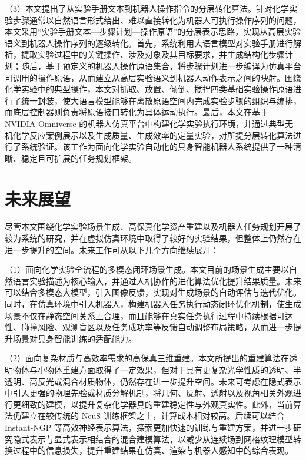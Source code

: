 （3）本文提出了从实验手册文本到机器人操作指令的分层转化算法。针对化学实验步骤通常以自然语言形式给出、难以直接转化为机器人可执行操作序列的问题，本文采用“实验手册文本—步骤计划—操作原语”的分层表示思路，实现从高层实验语义到机器人操作序列的逐级转化。首先，系统利用大语言模型对实验手册进行解析，提取实验过程中的关键操作、涉及对象及其目标要求，并生成结构化步骤计划；随后，基于预定义的机器人操作原语集合，将步骤计划进一步编译为仿真平台可调用的操作原语，从而建立从高层实验语义到机器人动作表示之间的映射。围绕化学实验中的典型操作，本文对抓取、放置、倾倒、搅拌四类基础实验操作原语进行了统一封装，使大语言模型能够在离散原语空间内完成实验步骤的组织与编排，而底层控制器则负责将原语接口转化为具体运动执行。最后，本文在基于 NVIDIA Omniverse 的机器人仿真平台中构建化学实验执行环境，并通过典型无机化学反应案例展示以及生成质量、生成效率的定量实验，对所提分层转化算法进行了系统验证。该工作为面向化学实验自动化的具身智能机器人系统提供了一种清晰、稳定且可扩展的任务规划框架。

\section{未来展望}

尽管本文围绕化学实验场景生成、高保真化学资产重建以及机器人任务规划开展了较为系统的研究，并在虚拟仿真环境中取得了较好的实验结果，但整体上仍然存在进一步提升的空间。未来工作可从以下几个方向继续展开：

（1）面向化学实验全流程的多模态闭环场景生成。本文目前的场景生成主要以自然语言实验描述为核心输入，并通过人机协作的进化算法优化提升结果质量。未来可以结合多模态大模型，引入图像反馈，实现对生成场景的自动评估与迭代优化。同时，在仿真环境中引入机器人，构建机器人任务执行动态闭环优化机制，使生成场景不仅在静态空间关系上合理，而且能够在真实任务执行过程中持续根据可达性、碰撞风险、观测盲区以及任务成功率等反馈自动调整布局策略，从而进一步提升场景对具身智能训练的适配能力。

（2）面向复杂材质与高效率需求的高保真三维重建。本文所提出的重建算法在透明物体与小物体重建方面取得了一定效果，但对于具有更复杂光学性质的透明、半透明、高反光或混合材质物体，仍然存在进一步提升空间。未来可考虑在隐式表示中引入更强的物理先验或材质分解机制，将几何、反射、透射以及视角相关外观进行更细致的建模，以提升复杂化学器具的重建稳定性与外观真实性。此外，当前算法仍建立在较传统的 NeuS 训练框架之上，计算成本相对较高。后续可以结合 Instant-NGP 等高效神经表示算法，探索更加快速的训练与重建方案，并进一步研究隐式表示与显式表示相结合的混合建模算法，以减少从连续场到网格纹理模型转换过程中的信息损失，提升重建结果在仿真、渲染与机器人感知中的综合表现。

